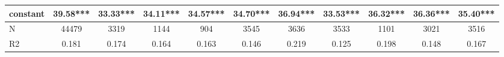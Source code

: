 {\begin{tabular}{l*{10}{c}}
constant    &       39.58***&       33.33***&       34.11***&       34.57***&       34.70***&       36.94***&       33.53***&       36.32***&       36.36***&       35.40***\\
\hline
N           &       44479   &        3319   &        1144   &         904   &        3545   &        3636   &        3533   &        1101   &        3021   &        3516   \\
R2          &       0.181   &       0.174   &       0.164   &       0.163   &       0.146   &       0.219   &       0.125   &       0.198   &       0.148   &       0.167   \\
\hline\hline
\end{tabular}
}
